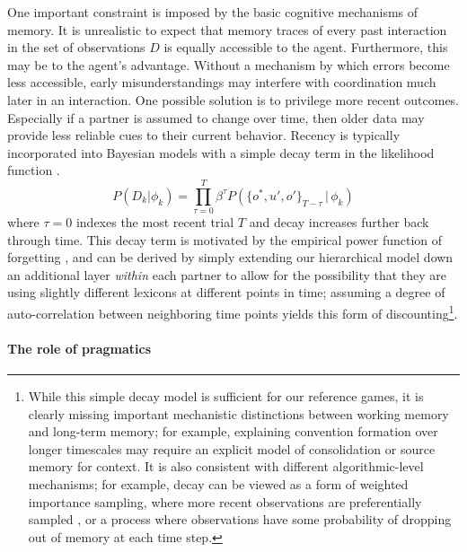 One important constraint is imposed by the basic cognitive mechanisms of memory.
It is unrealistic to expect that memory traces of every past interaction in the set of observations $D$ is equally accessible to the agent.
Furthermore, this may be to the agent's advantage.
Without a mechanism by which errors become less accessible, early misunderstandings may interfere with coordination much later in an interaction. 
One possible solution is to privilege more recent outcomes. 
Especially if a partner is assumed to change over time, then older data may provide less reliable cues to their current behavior.
Recency is typically incorporated into Bayesian models with a simple decay term in the likelihood function \cite{anderson2000adaptive,angela2009sequential,fudenberg2014recency,kalm2018visual}.
$$P(D_k | \phi_k) = \prod_{\tau=0}^T \beta^{\tau} P(\{o^*,u',o'\}_{T-\tau}\, |\, \phi_k)$$
where $\tau=0$ indexes the most recent trial $T$ and decay increases further back through time.
This decay term is motivated by the empirical power function of forgetting \cite{wixted1991form}, and can be derived by simply extending our hierarchical model down an additional layer \emph{within} each partner to allow for the possibility that they are using slightly different lexicons at different points in time; assuming a degree of auto-correlation between neighboring time points yields this form of discounting\footnote{While this simple decay model is sufficient for our reference games, it is clearly missing important mechanistic distinctions between working memory and long-term memory; for example, explaining convention formation over longer timescales may require an explicit model of consolidation or source memory for context. It is also consistent with different algorithmic-level mechanisms; for example, decay can be viewed as a form of weighted importance sampling, where more recent observations are preferentially sampled \cite{pearl2010online}, or a process where observations have some probability of dropping out of memory at each time step.}.


\paragraph{The role of pragmatics}

